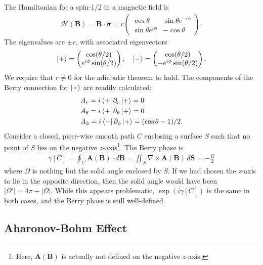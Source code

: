 \documentclass[reprint,
nofootinbib,
amsmath,amssymb,
aps]{revtex4-1}
\newcommand{\p}{\partial}
\newcommand{\f}[2]{\frac{#1}{#2}}
\begin{document}
The Hamiltonian for a spin-1/2 in a magnetic field is
\begin{align*}
\mathcal{H}(\bm{B}) = \bm{B}\cdot \bm{\sigma} = r \begin{pmatrix}
\cos\theta & \sin\theta e^{-i\phi} \\ \sin\theta e^{i\phi} & -\cos\theta
\end{pmatrix}.
\end{align*}
The eigenvalues are $\pm r$, with associated eigenvectors
\begin{align*}
\ket{+} = \begin{pmatrix}
\cos(\theta/2) \\ e^{i\phi}\sin(\theta/2) 
\end{pmatrix}, \quad \ket{-} = \begin{pmatrix}
\cos(\theta/2) \\ - e^{i\phi}\sin(\theta/2) 
\end{pmatrix} .
\end{align*}
We require that $r  \neq 0$ for the adiabatic theorem to hold. The components of the Berry connection for $\ket{+}$ are readily calculated:
\begin{align*}
&A_r = i\bra{+}\p_r \ket{+} = 0\\
&A_\theta = i\bra{+}\p_\theta\ket{+} = 0\\
&A_\phi = i\bra{+}\p_\phi \ket{+} = (\cos\theta - 1)/2.
\end{align*}
Consider a closed, piece-wise smooth path $C$ enclosing a surface $S$ such that no point of $S$ lies on the negative $z$-axis\footnote{Here, $\bm{A}(\bm{B})$ is actually not defined on the negative $z$-axis.}. The Berry phase is 
\begin{align*}
\gamma[C] = \oint_C \bm{A}(\bm{B}) \cdot d\bm{B} = \iint_S \nabla \times \bm{A}(\bm{B})  \, d\bm{S} = -\f{\Omega}{2} 
\end{align*}
where $\Omega$ is nothing but the solid angle enclosed by $S$. If we had chosen the $z$-axis to lie in the opposite direction, then the solid angle would have been $|\Omega'| = 4\pi - |\Omega|$.  While this appears problematic,  $\exp(i\gamma[C])$ is the same in both cases, and the Berry phase is still well-defined. 




\subsection{Aharonov-Bohm Effect}
\end{document}
